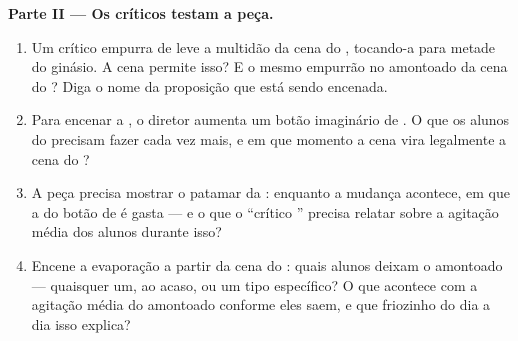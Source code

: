 \begin{problem}
\medskip\noindent\textbf{Parte II --- Os críticos testam a peça.}
\begin{enumerate}[resume]
  \item Um crítico empurra de leve a multidão da cena do ,
        tocando-a para metade do ginásio. A cena permite isso? E o
        mesmo empurrão no amontoado da cena do ? Diga o nome
        da proposição que está sendo encenada.
  \item Para encenar a \emph{}, o diretor aumenta um botão
        imaginário de . O que os alunos do  precisam fazer
        cada vez mais, e em que momento a cena vira legalmente a cena
        do ?
  \item A peça precisa mostrar o patamar da : enquanto a mudança
        acontece, em que a  do botão de  é gasta --- e o
        que o ``crítico '' precisa relatar sobre a agitação
        média dos alunos durante isso?
  \item Encene a evaporação a partir da cena do : quais alunos
        deixam o amontoado --- quaisquer um, ao acaso, ou um tipo
        específico? O que acontece com a agitação média do amontoado
        conforme eles saem, e que friozinho do dia a dia isso
        explica?
\end{enumerate}


\end{problem}
